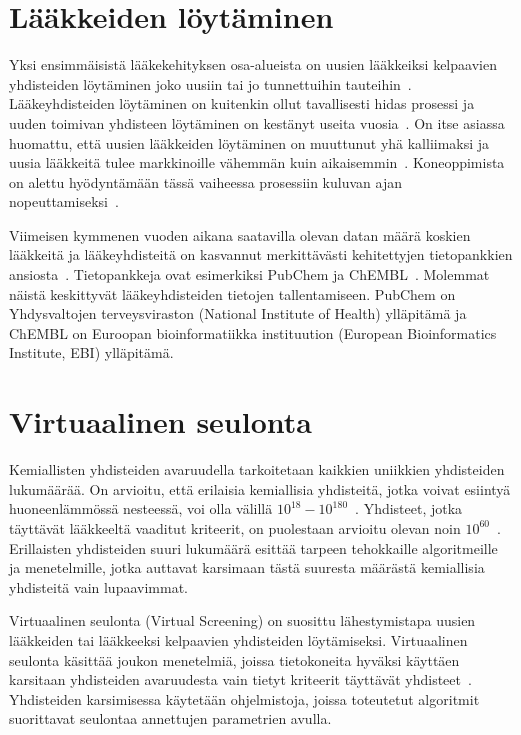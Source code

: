 \documentclass[finnish,twoside,censored,tkt,sw-line]{HYthesisML}
\begin{document}
\section{Lääkkeiden löytäminen}

Yksi ensimmäisistä lääkekehityksen osa-alueista on uusien lääkkeiksi kelpaavien yhdisteiden löytäminen joko uusiin tai jo tunnettuihin tauteihin~\cite{EkinsSean2019Emlf}.
Lääkeyhdisteiden löytäminen on kuitenkin ollut tavallisesti hidas prosessi ja uuden toimivan yhdisteen löytäminen on kestänyt useita vuosia~\cite{EkinsSean2019Emlf,MunosBernardH2011Htrb}.
On itse asiassa huomattu, että uusien lääkkeiden löytäminen on muuttunut yhä kalliimaksi ja uusia lääkkeitä tulee markkinoille vähemmän kuin aikaisemmin~\cite{MunosBernardH2011Htrb}.
Koneoppimista on alettu hyödyntämään tässä vaiheessa prosessiin kuluvan ajan nopeuttamiseksi~\cite{VamathevanJessica2019Aoml}.

Viimeisen kymmenen vuoden aikana saatavilla olevan datan määrä koskien lääkkeitä ja lääkeyhdisteitä on kasvannut merkittävästi kehitettyjen tietopankkien ansiosta~\cite{EkinsSean2019Emlf}.
Tietopankkeja ovat esimerkiksi PubChem ja ChEMBL~\cite{NationalCenterForBiotechnologyInformation,chembl}.
Molemmat näistä keskittyvät lääkeyhdisteiden tietojen tallentamiseen.
PubChem on Yhdysvaltojen terveysviraston (National Institute of Health) ylläpitämä ja ChEMBL on Euroopan bioinformatiikka instituution (European Bioinformatics Institute, EBI) ylläpitämä.

\section{Virtuaalinen seulonta}

Kemiallisten yhdisteiden avaruudella tarkoitetaan kaikkien uniikkien yhdisteiden lukumäärää.
On arvioitu, että erilaisia kemiallisia yhdisteitä, jotka voivat esiintyä huoneenlämmössä nesteessä, voi olla välillä \(10^{18} - 10^{180}\)~\cite{SotrifferChristoph2011VSPC}.
Yhdisteet, jotka täyttävät lääkkeeltä vaaditut kriteerit, on puolestaan arvioitu olevan noin \(10^{60}\)~\cite{SotrifferChristoph2011VSPC}.
Erillaisten yhdisteiden suuri lukumäärä esittää tarpeen tehokkaille algoritmeille ja menetelmille, jotka auttavat karsimaan tästä suuresta määrästä kemiallisia yhdisteitä vain lupaavimmat.

Virtuaalinen seulonta (Virtual Screening) on suosittu lähestymistapa uusien lääkkeiden tai lääkkeeksi kelpaavien yhdisteiden löytämiseksi.
Virtuaalinen seulonta käsittää joukon menetelmiä, joissa tietokoneita hyväksi käyttäen karsitaan yhdisteiden avaruudesta vain tietyt kriteerit täyttävät yhdisteet~\cite{SotrifferChristoph2011VSPC}.
Yhdisteiden karsimisessa käytetään ohjelmistoja, joissa toteutetut algoritmit suorittavat seulontaa annettujen parametrien avulla.
\end{document}

